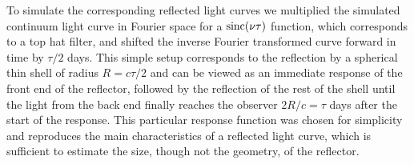 To simulate the corresponding reflected light curves we multiplied the simulated continuum light curve in Fourier space for a $\operatorname{sinc}(\nu\tau)$ function, which corresponds to a top hat filter, and shifted the inverse Fourier transformed curve forward in time by $\tau/2$ days. This simple setup corresponds to the reflection by a spherical thin shell of radius $R=c\tau/2$ and can be viewed as an immediate response of the front end of the reflector, followed by the reflection of the rest of the shell until the light from the back end finally reaches the observer $2R/c=\tau$ days after the start of the response. This particular response function was chosen for simplicity and reproduces the main characteristics of a reflected light curve, which is sufficient to estimate the size, though not the geometry, of the reflector.  

